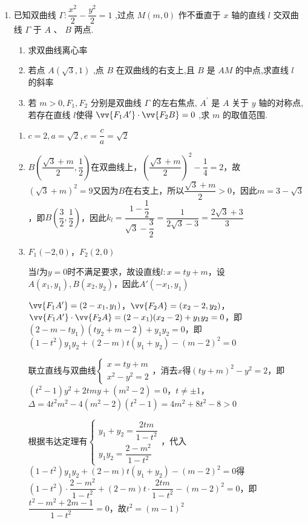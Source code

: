\begin{enumerate}

    
    \item 已知双曲线 $\Gamma  : \dfrac{{x}^{2}}{2} - \dfrac{{y}^{2}}{2} = 1$ ,过点 $M\left( {m,0}\right)$ 作不垂直于 $x$ 轴的直线 $l$ 交双曲线 $\Gamma$ 于 $A$ 、 $B$ 两点.
    \begin{enumerate}
        \item 求双曲线离心率
        \item 若点 $A\left( {\sqrt{3},1}\right)$ ,点 $B$ 在双曲线的右支上,且 $B$ 是 ${AM}$ 的中点,求直线 $l$ 的斜率
        \item 若 $m > 0,{F}_{1},{F}_{2}$ 分别是双曲线 $\Gamma$ 的左右焦点, ${A}^{\prime }$ 是 $A$ 关于 $y$ 轴的对称点,若存在直线 $l$使得 $\vv{{F}_{1}{A}^{\prime }} \cdot  \vv{{F}_{2}B} = 0$ ,求 $m$ 的取值范围.
    \end{enumerate}
    \begin{jieda}
        \begin{enumerate}
            \item $c = 2, a = \sqrt{2}, e = \dfrac{c}{a} = \sqrt{2}$
            \item $B\left(\dfrac{\sqrt{3}+m}{2}, \dfrac{1}{2}\right)$在双曲线上，$\left(\dfrac{\sqrt{3}+m}{2}\right)^2 - \dfrac{1}{4} = 2$，故$(\sqrt{3}+m)^2 =9$又因为$B$在右支上，所以$\dfrac{\sqrt{3}+m}{2} > 0$，因此$m = 3-\sqrt{3}$，即$B\left(\dfrac{3}{2}, \dfrac{1}{2}\right)$，因此$k_l = \dfrac{1-\dfrac{1}{2}}{\sqrt{3}-\dfrac{3}{2}} = \dfrac{1}{2\sqrt{3}-3} = \dfrac{2\sqrt{3}+3}{3}$
            \item $F_1(-2, 0)$，$F_2(2, 0)$
            
            当$l$为$y = 0$时不满足要求，故设直线$l:  x = ty + m$，设$A(x_1, y_1), B(x_2, y_2)$，因此$A'(-x_1, y_1)$

            $\vv{F_1A'} = (2-x_1, y_1)$，$\vv{F_2A} = (x_2-2, y_2)$，$\vv{F_1A'} \cdot \vv{F_2A} =(2-x_1)(x_2-2)+y_1y_2 = 0$，即$(2-m-ty_1)(ty_2+m-2)+y_1y_2 = 0$，即$(1-t^2)y_1y_2+(2-m)t(y_1+y_2)-(m-2)^2 = 0$

            联立直线与双曲线$\left\{\begin{array}{l}
                 x = ty+m  \\
                 x^2-y^2 = 2
            \end{array}\right.$，消去$x$得$(ty+m)^2-y^2 = 2$，即$(t^2-1)y^2+2tmy+(m^2-2) = 0$，$t \neq \pm 1$，$\Delta = 4t^2m^2 - 4(m^2-2)(t^2-1) = 4m^2+8t^2-8 > 0$

            根据韦达定理有$\left\{\begin{array}{l}
                 y_1+y_2 = \dfrac{2tm}{1-t^2} \\
                 y_1y_2 = \dfrac{2-m^2}{1-t^2}
            \end{array}\right.$，代入$(1-t^2)y_1y_2+(2-m)t(y_1+y_2) -(m-2)^2 = 0$得$(1-t^2)\cdot\dfrac{2-m^2}{1-t^2}+(2-m)t\cdot\dfrac{2tm}{1-t^2}-(m-2)^2 = 0$，即$\dfrac{t^2-m^2+2m-1}{1-t^2} = 0$，故$t^2 = (m-1)^2$


\end{enumerate}
\end{jieda}
\end{enumerate}
